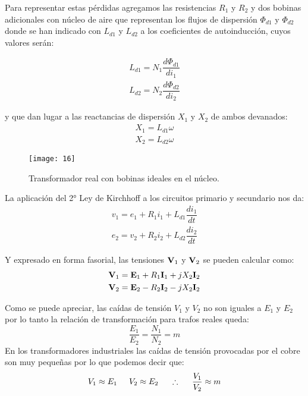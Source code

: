 Para representar estas pérdidas agregamos las resistencias $R_{1}$ y $R_{2}$ y dos bobinas adicionales con núcleo de aire que representan los flujos de dispersión $\Phi_{d1}$ y $\Phi_{d2}$ donde se han indicado con $L_{d1}$ y $L_{d2}$ a los coeficientes de autoinducción, cuyos valores serán:

\begin{equation*}
	\begin{split}
		L_{d1} = N_1 \dfrac{d\Phi_{d1}}{di_1} \\
		L_{d2} = N_2 \dfrac{d\Phi_{d2}}{di_2}
	\end{split}
\end{equation*}

y que dan lugar a las reactancias de dispersión $X_{1}$ y $X_{2}$ de ambos devanados:
\begin{equation*}
	\begin{split}
		X_1 = L_{d1} \omega \\
		X_2 = L_{d2} \omega
	\end{split}
\end{equation*}

 \begin{figure}[H]
	\centering
	\texttt{[image: 16]}
	\caption{Transformador real con bobinas ideales en el núcleo.}
	\label{fig:tranformador-real}
\end{figure} 

La aplicación del 2° Ley de Kirchhoff a los circuitos primario y secundario nos da:
\begin{equation*}
	\begin{split}
		v_1 = e_1 + R_1 i_1 + L_{d1} \dfrac{di_1}{dt}\\
		e_2 = v_2 + R_2 i_2 + L_{d2} \dfrac{di_2}{dt}
	\end{split}
\end{equation*}

Y expresado en forma fasorial, las tensiones $\fasor{V}_1$ y $\fasor{V}_2$ se pueden calcular como:
\begin{equation*}
	\begin{split}
		\fasor{v}_{1} = \fasor{e}_{1} + R_{1}  \fasor{i}_{1} + j X_{2} \fasor{i}_{2} \\
		\fasor{v}_{2} = \fasor{e}_{2} - R_{2} \fasor{i}_{2} - j X_{2} \fasor{i}_{2}
	\end{split}
\end{equation*}
 
Como se puede apreciar, las caídas de tensión $V_{1}$ y $V_{2}$ no son iguales a $E_{1}$ y $E_{2}$ por lo tanto la relación de transformación para trafos reales queda:
\begin{equation}
	\dfrac{E_{1}}{E_{2}}=\dfrac{N_{1}}{N_{2}}=m
	\label{eq:rel-transf-real}
\end{equation}
En los transformadores industriales las caídas de tensión provocadas por el cobre son muy pequeñas por lo que podemos decir que:
\begin{equation}
	V_{1} \approx E_{1} \hspace{5mm}  V_{2} \approx E_{2}  \hspace{5mm} \therefore \hspace{5mm} \dfrac{V_{1}}{V_{2}} \approx m
\end{equation}

